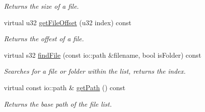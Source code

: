 \begin{DoxyCompactItemize}
\begin{DoxyCompactList}\small\item\em Returns the size of a file. \end{DoxyCompactList}\item 
virtual u32 \hyperlink{classirr_1_1io_1_1_c_file_list_a78881869f65a798246d0463073d45df5}{get\-File\-Offset} (u32 index) const 
\begin{DoxyCompactList}\small\item\em Returns the offest of a file. \end{DoxyCompactList}\item 
\hypertarget{classirr_1_1io_1_1_c_file_list_a4df7b3348cd220280679338e0e55d0b5}{virtual s32 \hyperlink{classirr_1_1io_1_1_c_file_list_a4df7b3348cd220280679338e0e55d0b5}{find\-File} (const io\-::path \&filename, bool is\-Folder) const }\label{classirr_1_1io_1_1_c_file_list_a4df7b3348cd220280679338e0e55d0b5}

\begin{DoxyCompactList}\small\item\em Searches for a file or folder within the list, returns the index. \end{DoxyCompactList}\item 
\hypertarget{classirr_1_1io_1_1_c_file_list_af263e13696c5872355cddc49465bbe9b}{virtual const io\-::path \& \hyperlink{classirr_1_1io_1_1_c_file_list_af263e13696c5872355cddc49465bbe9b}{get\-Path} () const }\label{classirr_1_1io_1_1_c_file_list_af263e13696c5872355cddc49465bbe9b}

\begin{DoxyCompactList}\small\item\em Returns the base path of the file list. \end{DoxyCompactList}\end{DoxyCompactItemize}
